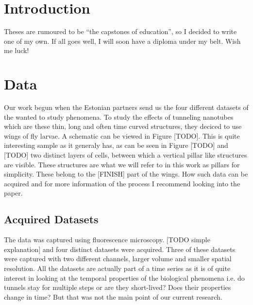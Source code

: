 \documentclass[
  digital,     %
  oneside,     %
  nosansbold,  %
  nocolorbold, %
  lof,         %
  lot,         %
]{fithesis4}
\begin{document}
\chapter*{Introduction}

Theses are rumoured to be \enquote{the capstones of education}, so
I decided to write one of my own. If all goes well, I will soon
have a diploma under my belt. Wish me luck!

\chapter{Data}

Our work begun when the Estonian partners send us the four different datasets of
the wanted to study phenomena. To study the effects of tunneling nanotubes which
are these thin, long and often time curved structures, they deciced to use wings
of fly larvae. A schematic can be viewed in Figure [TODO]. This is quite
interesting sample as it generaly has, as can be seen in Figure [TODO] and
[TODO] two distinct layers of cells, between which a vertical pillar like
structures are visible. These structures are what we will refer to in this work
as pillars for simplicity. These belong to the [FINISH] part of the wings. How
such data can be acquired and for more information of the process I recommend
looking into the \parencite{Tran2024Programmed} paper.

\section{Acquired Datasets}

The data was captured using fluorescence microscopy. [TODO simple explanation]
and four distinct datasets were acquired. Three of these datasets were captured
with two different channels, larger volume and smaller spatial resolution. All
the datasets are actually part of a time series as it is of quite interest in
looking at the temporal properties of the biological phenomena i.e. do tunnels
stay for multiple steps or are they short-lived? Does their properties change in
time? But that was not the main point of our current research.
\end{document}
